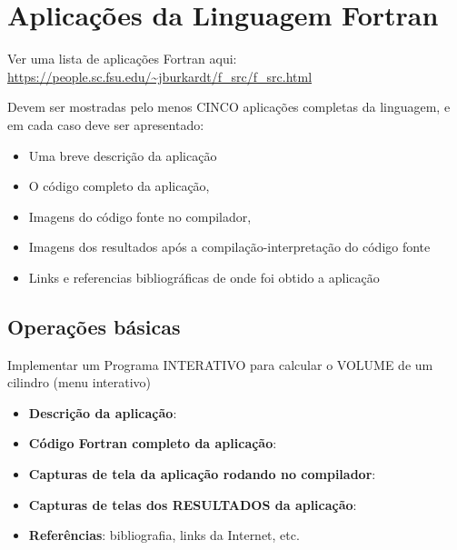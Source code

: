 


\chapter{ Aplica\c{c}\~{o}es da Linguagem Fortran}

Ver uma lista de aplica\c{c}\~{o}es Fortran aqui:
\url{https://people.sc.fsu.edu/~jburkardt/f_src/f_src.html}

Devem ser mostradas pelo menos CINCO aplica\c{c}\~{o}es completas da linguagem, e em cada caso deve ser apresentado:
\begin{itemize}
  \item Uma breve descri\c{c}\~{a}o da aplica\c{c}\~{a}o
  \item O c\'{o}digo completo da aplica\c{c}\~{a}o,
  \item Imagens do c\'{o}digo fonte no compilador,
  \item Imagens dos resultados ap\'{o}s a compila\c{c}\~{a}o-interpreta\c{c}\~{a}o do c\'{o}digo fonte
  \item Links e referencias bibliogr\'{a}ficas de onde foi obtido a aplica\c{c}\~{a}o
\end{itemize}



    \section{Opera\c{c}\~{o}es b\'{a}sicas}
    Implementar um Programa INTERATIVO para calcular o VOLUME de um cilindro (menu interativo)
    \begin{itemize}
      \item \textbf{Descri\c{c}\~{a}o da aplica\c{c}\~{a}o}:
      \item \textbf{C\'{o}digo Fortran completo da aplica\c{c}\~{a}o}:
      \item \textbf{Capturas de tela da aplica\c{c}\~{a}o rodando no compilador}:
      \item \textbf{Capturas de telas dos RESULTADOS da aplica\c{c}\~{a}o}:
      \item \textbf{Refer\^{e}ncias}: bibliografia, links da Internet, etc.
    \end{itemize}



